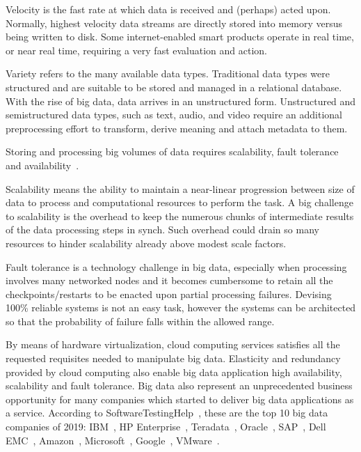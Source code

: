 Velocity is the fast rate at which data is received and (perhaps) acted upon. Normally, highest velocity data streams are directly stored into memory versus being written to disk. Some internet-enabled smart products operate in real time, or near real time, requiring a very fast evaluation and action. 

Variety refers to the many available data types. Traditional data types were structured and are suitable to be stored and managed in a relational database. With the rise of big data, data arrives in an unstructured form. Unstructured and semistructured data types, such as text, audio, and video require an additional preprocessing effort to transform, derive meaning and attach metadata to them. 

Storing and processing big volumes of data requires scalability, fault tolerance and availability~\cite{articleBigData:2017}. 

Scalability means the ability to maintain a near-linear progression between size of data to process and computational resources to perform the task. A big challenge to scalability is the overhead to keep the numerous chunks of intermediate results of the data processing steps in synch. Such overhead could drain so many resources to hinder scalability already above modest scale factors.

Fault tolerance is a technology challenge in big data, especially when processing involves many networked nodes and it becomes cumbersome to retain all the checkpoints/restarts to be  enacted upon partial processing failures. Devising 100\% reliable systems is not an easy task, however the systems can be architected so that the probability of failure falls within the allowed range. 

By means of hardware virtualization, cloud computing services satisfies all the requested requisites needed to manipulate big data. Elasticity and redundancy provided by cloud computing also enable big data application high availability, scalability and fault tolerance.
Big data also represent an unprecedented business opportunity for many companies which started to deliver big data applications as a service. According to SoftwareTestingHelp~\cite{misc:BigDataCompanies}, these are the top 10 big data companies of 2019: IBM~\cite{misc:IBM}, HP Enterprise~\cite{misc:HPE}, Teradata~\cite{misc:Teradata}, Oracle~\cite{misc:Oracle}, SAP~\cite{misc:SAP}, Dell EMC~\cite{misc:EMC}, Amazon~\cite{misc:AWS}, Microsoft~\cite{misc:Microsoft}, Google~\cite{misc:Google}, VMware~\cite{misc:VMware}.

